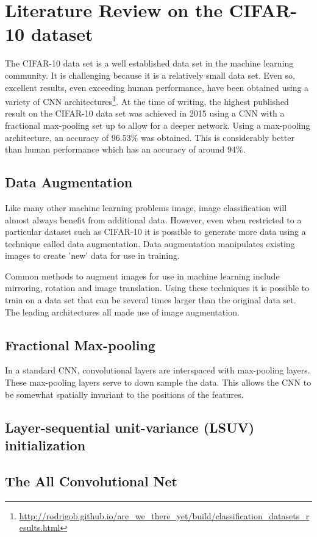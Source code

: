 \section{Literature Review on the CIFAR-10 dataset}\label{sec:litReviewCifar}
	\pagestyle{tom}

The CIFAR-10 data set\cite{krizhevsky2009learning} is a well established data set in the machine learning community. It is challenging because it is a relatively small data set. Even so, excellent results, even exceeding human performance, have been obtained using a variety of CNN architectures\footnote{\url{http://rodrigob.github.io/are_we_there_yet/build/classification_datasets_results.html}}. At the time of writing, the highest published result on the CIFAR-10 data set was achieved in 2015 using a CNN with a fractional max-pooling set up to allow for a deeper network\cite{graham2014fractional}. Using a max-pooling architecture, an accuracy of $96.53\%$ was obtained. This is considerably better than human performance which has an accuracy of around $94\%$\cite{karpathy2011lessons}.

\subsection{Data Augmentation}
Like many other machine learning problems image, image classification will almost always benefit from additional data\cite{halevy2009unreasonable}. However, even when restricted to a particular dataset such as CIFAR-10 it is possible to generate more data using a technique called data augmentation\cite{cui2015data}. Data augmentation manipulates existing images to create 'new' data for use in training.

Common methods to augment images for use in machine learning include mirroring, rotation and image translation\cite{krizhevsky}. Using these techniques it is possible to train on a data set that can be several times larger than the original data set. The leading architectures all made use of image augmentation\cite{graham2014fractional}\cite{mishkin2015all}\cite{springenberg2014striving}.

\subsection{Fractional Max-pooling}
In a standard CNN, convolutional layers are interspaced with max-pooling layers. These max-pooling layers serve to down sample the data. This allows the CNN to be somewhat spatially invariant to the positions of the features.

\subsection{Layer-sequential unit-variance (LSUV) initialization}

\subsection{The All Convolutional Net}
